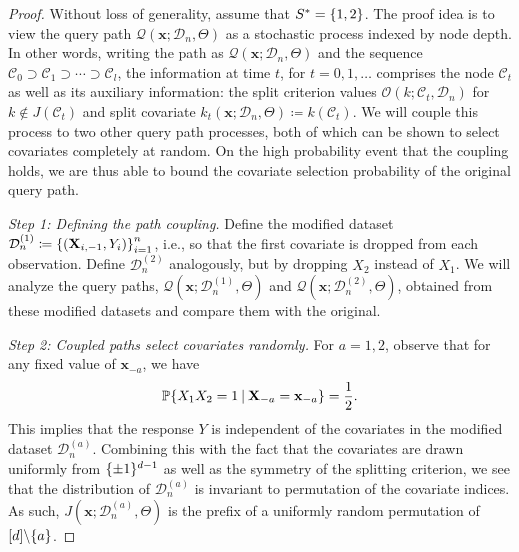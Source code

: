 \documentclass[11pt]{article}
\newcommand{\bx}{\mathbf{x}}
\newcommand{\bX}{\mathbf{X}}
\DeclarePairedDelimiter{\braces}{\lbrace}{\rbrace}
\DeclarePairedDelimiter{\paren}{(}{)}
\renewcommand{\P}{\mathbb{P}}
\newcommand{\cell}{\mathcal{C}}
\newcommand{\nfeats}{d}
\newcommand{\nsamples}{n}
\newcommand{\coordindices}{[\nfeats]}
\newcommand{\data}[1][n]{\mathcal{D}_{#1}}
\newcommand{\featindices}{J}
\newcommand{\cellfeatindices}{J}
\renewcommand{\path}{\mathcal{Q}}
\newcommand{\suppset}{S^*}
\newcommand{\querypath}{\mathcal{Q}}
\begin{document}
\begin{proof}
    Without loss of generality, assume that $\suppset = \braces*{1,2}$.
    The proof idea is to view the query path $\querypath(\bx;\data,\Theta)$ as a stochastic process indexed by node depth.
    In other words, writing the path as $\querypath(\bx;\data,\Theta)$ and the sequence $\cell_0 \supset \cell_1 \supset \cdots \supset \cell_l$, the information at time $t$, for $t=0,1,\ldots $ comprises the node $\cell_t$ as well as its auxiliary information: the split criterion values $\mathcal{O}(k;\cell_t,\data)$ for $k \notin \cellfeatindices(\cell_t)$ and split covariate $k_t(\bx;\data,\Theta) \coloneqq k(\cell_t)$.
    We will couple this process to two other query path processes, both of which can be shown to select covariates completely at random.
    On the high probability event that the coupling holds, we are thus able to bound the covariate selection probability of the original query path.
    
    \textit{Step 1: Defining the path coupling.}
    Define the modified dataset $\data^{(1)} \coloneqq \braces*{(\bX_{i,-1},Y_i)}_{i=1}^\nsamples$, i.e., so that the first covariate is dropped from each observation.
    Define $\data^{(2)}$ analogously, but by dropping $X_2$ instead of $X_1$.
    We will analyze the query paths, $\querypath(\bx;\data^{(1)},\Theta)$ and $\querypath(\bx;\data^{(2)},\Theta)$, obtained from these modified datasets and compare them with the original.

    \textit{Step 2: Coupled paths select covariates randomly.}
    For $a=1,2$, observe that for any fixed value of $\bx_{-a}$, we have
    \begin{equation}
        \P\braces*{X_1X_2 = 1 ~\vline~ \bX_{-a} = \bx_{-a}} = \frac{1}{2}.
    \end{equation}
    This implies that the response $Y$ is independent of the covariates in the modified dataset $\data^{(a)}$.
    Combining this with the fact that the covariates are drawn uniformly from $\braces{\pm 1}^{\nfeats-1}$ as well as the symmetry of the splitting criterion, we see that the distribution of $\data^{(a)}$ is invariant to permutation of the covariate indices.
    As such, $J(\bx;\data^{(a)},\Theta)$ is the prefix of a uniformly random permutation of $\coordindices\backslash\braces{a}$.


\end{proof}
\end{document}
